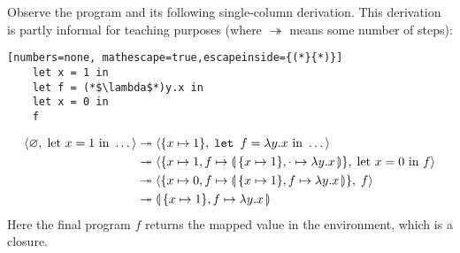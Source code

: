 \begin{Example}

   Observe the program and its following single-column derivation. This derivation is 
   partly informal for teaching purposes (where $\twoheadrightarrow$ means some number of steps):
   \begin{lstlisting}[numbers=none, mathescape=true,escapeinside={(*}{*)}]
    let x = 1 in
    let f = (*$\lambda$*)y.x in
    let x = 0 in
    f
    \end{lstlisting}

    \vspace{-1em}
    \begin{align*}
      \langle\varnothing,\; \text{let } x = 1 \text{ in }  \dots \rangle&\twoheadrightarrow  \langle \{x\mapsto 1\},\; \texttt{let } f = \lambda y.x \text{ in } \dots \rangle \\
            &\twoheadrightarrow \langle \{x\mapsto 1, f\mapsto \llparenthesis\,\{x\mapsto 1\},\cdot\mapsto\lambda y.x\,\rrparenthesis\},\; \text{let } x = 0 \text{ in } f \rangle \\
            &\twoheadrightarrow \langle \{x\mapsto 0, f\mapsto \llparenthesis\,\{x\mapsto 1\},f\mapsto\lambda y.x\,\rrparenthesis\},\; f \rangle \\
            &\twoheadrightarrow \llparenthesis\, \{x\mapsto 1\},f\mapsto\lambda y.x\,\rrparenthesis\\
    \end{align*}
    \noindent
    Here the final program $f$ returns the mapped value in the environment, which is a closure.
  \end{Example}

